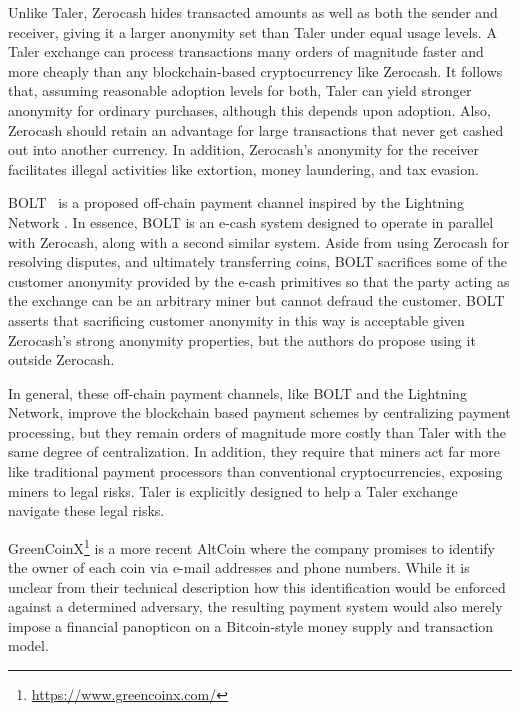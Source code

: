 \documentclass[sigconf, authordraft]{acmart}
\begin{document}
Unlike Taler, Zerocash hides transacted amounts as well as both the
sender and receiver, giving it a larger anonymity set than Taler under
equal usage levels.  A Taler exchange can process transactions many
orders of magnitude faster and more cheaply than any blockchain-based
cryptocurrency like Zerocash.  It follows that, assuming reasonable
adoption levels for both, Taler can yield stronger anonymity for
ordinary purchases, although this depends upon adoption.
Also, Zerocash should retain an advantage for large transactions that
never get cashed out into another currency.
In addition, Zerocash's anonymity for the receiver facilitates illegal
activities like extortion, money laundering, and tax evasion.

BOLT~\cite{BOLT} is a proposed off-chain payment channel inspired by
the Lightning Network \cite{LightningNetwork}.  In essence, BOLT is
an e-cash system designed to operate in parallel with Zerocash, along
with a second similar system.  Aside from using Zerocash for resolving
disputes, and ultimately transferring coins, BOLT sacrifices some of
the customer anonymity provided by the e-cash primitives so that the
party acting as the exchange can be an arbitrary miner but cannot
defraud the customer.  BOLT asserts that sacrificing customer anonymity
in this way is acceptable given Zerocash's strong anonymity properties,
but the authors do propose using it outside Zerocash.

In general, these off-chain payment channels, like BOLT and the
Lightning Network, improve the blockchain based payment schemes by
centralizing payment processing, but they remain orders of magnitude
more costly than Taler with the same degree of centralization.
In addition, they require that miners act far more like traditional
payment processors than conventional cryptocurrencies, exposing miners
to legal risks.  Taler is explicitly designed to help a Taler exchange
navigate these legal risks.

GreenCoinX\footnote{\url{https://www.greencoinx.com/}} is a more
recent AltCoin where the company promises to identify the owner of
each coin via e-mail addresses and phone numbers.  While it is unclear
from their technical description how this identification would be
enforced against a determined adversary, the resulting payment system
would also merely impose a financial panopticon on a Bitcoin-style
money supply and transaction model.

\end{document}
